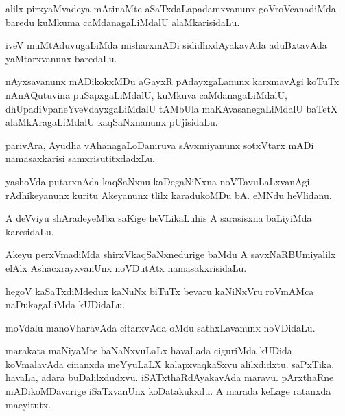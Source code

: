 \documentclass{article}
\begin{document}
\begin{mn}%
alilx pirxyaMvadeya mAtinaMte aSaTxdaLapadamxvanunx goVroVcanadiMda baredu kuMkuma 
caMdanagaLiMdalU alaMkarisidaLu.
\end{mn}

\begin{mn}%
iveV muMtAduvugaLiMda misharxmADi sididhxdAyakavAda aduBxtavAda yaMtarxvanunx baredaLu.
\end{mn}

\begin{mn}%
nAyxsavanunx mADikokxMDu aGayxR pAdayxgaLanunx karxmavAgi koTuTx nAnAQutuvina 
puSapxgaLiMdalU, kuMkuva caMdanagaLiMdalU, dhUpadiVpaneYveVdayxgaLiMdalU tAMbUla 
maKAvasanegaLiMdalU baTetX alaMkAragaLiMdalU kaqSaNxnanunx pUjisidaLu.
\end{mn}

\begin{mn}%
parivAra, Ayudha vAhanagaLoDaniruva sAvxmiyanunx sotxVtarx mADi namasaxkarisi 
samxrisutitxdadxLu.
\end{mn}

\begin{mn}%
yashoVda putarxnAda kaqSaNxnu kaDegaNiNxna noVTavuLaLxvanAgi rAdhikeyanunx kuritu 
Akeyanunx tlilx karadukoMDu bA. eMNdu heVlidanu. 
\end{mn}

\begin{mn}%
A deVviyu shAradeyeMba saKige heVLikaLuhis A sarasisxna baLiyiMda karesidaLu.
\end{mn}

\begin{mn}%
Akeyu perxVmadiMda shirxVkaqSaNxnedurige baMdu A savxNaRBUmiyalilx elAlx AshacxrayxvanUnx 
noVDutAtx namasakxrisidaLu.
\end{mn}

\begin{mn}%
hegoV kaSaTxdiMdedux kaNuNx biTuTx bevaru kaNiNxVru roVmAMca naDukagaLiMda kUDidaLu.
\end{mn}

\begin{mn}%
moVdalu manoVharavAda citarxvAda oMdu sathxLavanunx noVDidaLu.
\end{mn}

\begin{mn}%
marakata maNiyaMte baNaNxvuLaLx havaLada ciguriMda kUDida koVmalavAda cinanxda meYyuLaLX 
kalapxvaqkaSxvu alilxdidxtu. saPxTika, havaLa, adara buDalilxdudxvu. iSATxthaRdAyakavAda 
maravu. pArxthaRne mADikoMDavarige iSaTxvanUnx koDatakukxdu. A marada keLage ratanxda 
maeyitutx.
\end{mn}
\end{document}
